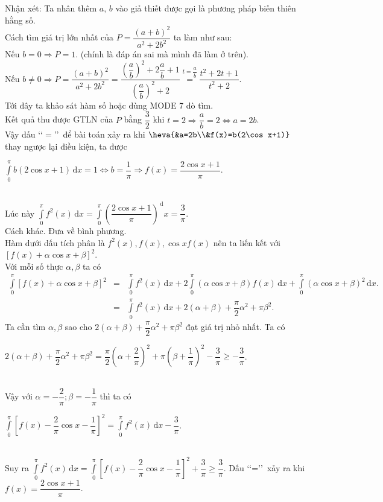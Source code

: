 \begin{ex}
{		Nhận xét: Ta nhân thêm $a,\,b$ vào giả thiết được gọi là phương pháp biến thiên hằng số.\\
		Cách tìm giá trị lớn nhất của $P=\dfrac{(a+b)^2}{a^2+2b^2}$ ta làm như sau:\\
		Nếu $b=0\Rightarrow  P=1$. (chính là đáp án sai mà mình đã làm ở trên).\\
		Nếu $b\neq 0\Rightarrow  P=\dfrac{(a+b)^2}{a^2+2b^2}=\dfrac{\left(\dfrac{a}{b}\right)^2+2\dfrac{a}{b}+1}{\left(\dfrac{a}{b}\right)^2+2}\overset{t=\dfrac{a}{b}}{=}\dfrac{t^2+2t+1}{t^2+2}$.\\ Tới đây ta khảo sát hàm số hoặc dùng MODE 7 dò tìm.\\ Kết quả thu được GTLN của $P$ bằng $\dfrac{3}{2}$ khi $t=2\Rightarrow  \dfrac{a}{b}=2\Leftrightarrow a=2b$.\\
		Vậy dấu \lq\lq $=$\rq\rq\, để bài toán xảy ra khi $\heva{&a=2b\\&f(x)=b(2\cos x+1)}$ thay ngược lại điều kiện, ta được\\
		\centerline{	$\displaystyle\int\limits_0^{\pi} b(2\cos x+1)\mathrm{\,d}x=1\Leftrightarrow b=\dfrac{1}{\pi}\Rightarrow  f(x)=\dfrac{2\cos x+1}{\pi}$.}\\
		Lúc này $\displaystyle\int\limits_0^{\pi} f^2(x)\mathrm{\,d}x=\displaystyle\int\limits_0^{\pi}\left(\dfrac{2\cos x+1}{\pi}\right)^\mathrm{\,d}x=\dfrac{3}{\pi}$.\\
		Cách khác. Đưa về bình phương.\\
		Hàm dưới dấu tích phân là $f^2(x), f(x),\cos xf(x)$ nên ta liến kết với $\left[f(x)+\alpha\cos x+\beta\right]^2$.\\
		Với mỗi số thực $\alpha,\beta$ ta có
		\begin{eqnarray*}
			\displaystyle\int\limits_0^{\pi}\left[f(x)+\alpha\cos x+\beta\right]^2&=&\displaystyle\int\limits_0^{\pi} f^2(x)\mathrm{\,d}x+2\displaystyle\int\limits_0^{\pi}\left(\alpha\cos x+\beta\right)f(x)\mathrm{\,d}x+\displaystyle\int\limits_0^{\pi}\left(\alpha\cos x+\beta\right)^2\mathrm{\,d}x.\\
			&=&\displaystyle\int\limits_0^{\pi} f^2(x)\mathrm{\,d}x+2\left(\alpha+\beta\right)+\dfrac{\pi}{2}\alpha^2+\pi\beta^2.
		\end{eqnarray*}
		Ta cần tìm $\alpha,\beta$ sao cho $2\left(\alpha+\beta\right)+\dfrac{\pi}{2}\alpha^2+\pi\beta^2$ đạt giá trị nhỏ nhất. Ta có\\
		\centerline{	$2\left(\alpha+\beta\right)+\dfrac{\pi}{2}\alpha^2+\pi\beta^2=\dfrac{\pi}{2}\left(\alpha+\dfrac{2}{\pi}\right)^2+\pi\left(\beta+\dfrac{1}{\pi}\right)^2-\dfrac{3}{\pi}\geq-\dfrac{3}{\pi}$.}\\
		Vậy với $\alpha=-\dfrac{2}{\pi};\beta=-\dfrac{1}{\pi}$ thì ta có\\
		\centerline{$\displaystyle\int\limits_0^{\pi}\left[f(x)-\dfrac{2}{\pi}\cos x-\dfrac{1}{\pi}\right]^2=\displaystyle\int\limits_0^{\pi} f^2(x)\mathrm{\,d}x-\dfrac{3}{\pi}$.}\\
		Suy ra $\displaystyle\int\limits_0^{\pi} f^2(x)\mathrm{\,d}x=\displaystyle\int\limits_0^{\pi}\left[f(x)-\dfrac{2}{\pi}\cos x-\dfrac{1}{\pi}\right]^2+\dfrac{3}{\pi}\geq\dfrac{3}{\pi}$. Dấu \lq\lq =\rq\rq\, xảy ra khi $f(x)=\dfrac{2\cos x+1}{\pi}$.}
\end{ex}

